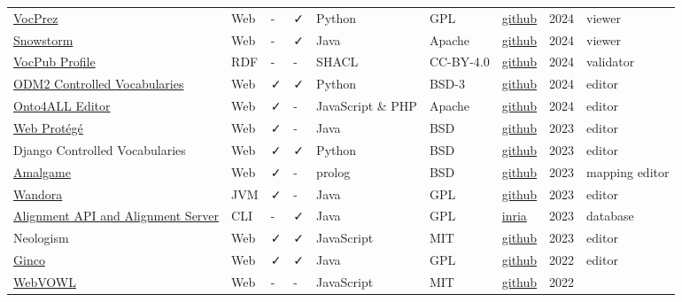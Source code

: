 \documentclass[
  DIV=10]{article}
\begin{document}
\begin{longtable}[]{@{}lllllllll@{}}
\href{https://github.com/RDFLib/VocPrez}{VocPrez} & Web & - & ✓ & Python
& GPL & \href{https://github.com/RDFLib/VocPrez}{github} & 2024 &
viewer \\
\href{https://github.com/IHTSDO/snowstorm}{Snowstorm} & Web & - & ✓ &
Java & Apache & \href{https://github.com/IHTSDO/snowstorm}{github} &
2024 & viewer \\
\href{https://surroundaustralia.github.io/vocpub-profile/profile.html}{VocPub
Profile} & RDF & - & - & SHACL & CC-BY-4.0 &
\href{https://github.com/AGLDWG/vocpub-profile/}{github} & 2024 &
validator \\
\href{http://vocabulary.odm2.org/}{ODM2 Controlled Vocabularies} & Web &
✓ & ✓ & Python & BSD-3 &
\href{https://github.com/ODM2/ODM2ControlledVocabularies}{github} & 2024
& editor \\
\href{https://onto4all.com/}{Onto4ALL Editor} & Web & ✓ & - & JavaScript
\& PHP & Apache & \href{https://github.com/NCOR-BR/onto4all}{github} &
2024 & editor \\
\href{https://protegewiki.stanford.edu/wiki/WebProtege}{Web Protégé} &
Web & ✓ & - & Java & BSD &
\href{https://github.com/protegeproject/webprotege}{github} & 2023 &
editor \\
Django Controlled Vocabularies & Web & ✓ & ✓ & Python & BSD &
\href{https://github.com/unt-libraries/django-controlled-vocabularies}{github}
& 2023 & editor \\
\href{https://semanticweb.cs.vu.nl/amalgame/}{Amalgame} & Web & ✓ & - &
prolog & BSD & \href{https://github.com/jrvosse/amalgame}{github} & 2023
& mapping editor \\
\href{http://wandora.org/www/}{Wandora} & JVM & ✓ & - & Java & GPL &
\href{https://github.com/wandora-team/wandora}{github} & 2023 &
editor \\
\href{https://moex.gitlabpages.inria.fr/alignapi/}{Alignment API and
Alignment Server} & CLI & - & ✓ & Java & GPL &
\href{https://gitlab.inria.fr/moex/alignapi/}{inria} & 2023 &
database \\
Neologism & Web & ✓ & ✓ & JavaScript & MIT &
\href{https://github.com/Semantic-Society/Neologism}{github} & 2023 &
editor \\
\href{http://culturecommunication.github.io/ginco/}{Ginco} & Web & ✓ & ✓
& Java & GPL &
\href{https://github.com/culturecommunication/ginco}{github} & 2022 &
editor \\
\href{https://service.tib.eu/webvowl/}{WebVOWL} & Web & - & - &
JavaScript & MIT &
\href{https://github.com/VisualDataWeb/WebVOWL}{github} & 2022 &

\end{longtable}
\end{document}
